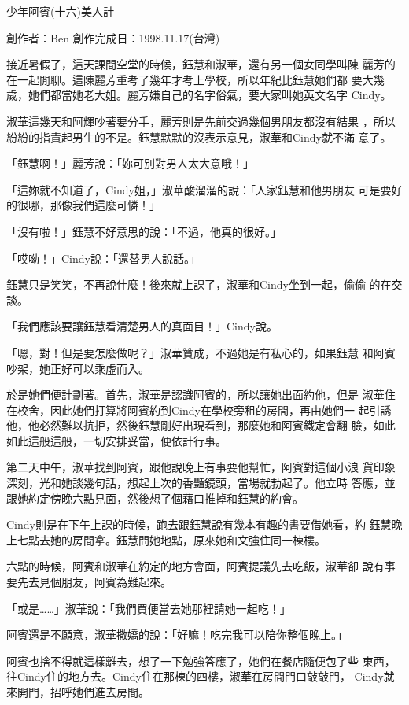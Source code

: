 



少年阿賓(十六)美人計

創作者：Ben
創作完成日：1998.11.17(台灣)


接近暑假了，這天課間空堂的時候，鈺慧和淑華，還有另一個女同學叫陳
麗芳的在一起閒聊。這陳麗芳重考了幾年才考上學校，所以年紀比鈺慧她們都
要大幾歲，她們都當她老大姐。麗芳嫌自己的名字俗氣，要大家叫她英文名字
Cindy。

淑華這幾天和阿輝吵著要分手，麗芳則是先前交過幾個男朋友都沒有結果
，所以紛紛的指責起男生的不是。鈺慧默默的沒表示意見，淑華和Cindy就不滿
意了。

「鈺慧啊！」麗芳說：「妳可別對男人太大意哦！」

「這妳就不知道了，Cindy姐，」淑華酸溜溜的說：「人家鈺慧和他男朋友
可是要好的很哪，那像我們這麼可憐！」

「沒有啦！」鈺慧不好意思的說：「不過，他真的很好。」

「哎呦！」Cindy說：「還替男人說話。」

鈺慧只是笑笑，不再說什麼！後來就上課了，淑華和Cindy坐到一起，偷偷
的在交談。

「我們應該要讓鈺慧看清楚男人的真面目！」Cindy說。

「嗯，對！但是要怎麼做呢？」淑華贊成，不過她是有私心的，如果鈺慧
和阿賓吵架，她正好可以乘虛而入。

於是她們便計劃著。首先，淑華是認識阿賓的，所以讓她出面約他，但是
淑華住在校舍，因此她們打算將阿賓約到Cindy在學校旁租的房間，再由她們一
起引誘他，他必然難以抗拒，然後鈺慧剛好出現看到，那麼她和阿賓鐵定會翻
臉，如此如此這般這般，一切安排妥當，便依計行事。

第二天中午，淑華找到阿賓，跟他說晚上有事要他幫忙，阿賓對這個小浪
貨印象深刻，光和她談幾句話，想起上次的香豔鏡頭，當場就勃起了。他立時
答應，並跟她約定傍晚六點見面，然後想了個藉口推掉和鈺慧的約會。

Cindy則是在下午上課的時候，跑去跟鈺慧說有幾本有趣的書要借她看，約
鈺慧晚上七點去她的房間拿。鈺慧問她地點，原來她和文強住同一棟樓。

六點的時候，阿賓和淑華在約定的地方會面，阿賓提議先去吃飯，淑華卻
說有事要先去見個朋友，阿賓為難起來。

「或是……」淑華說：「我們買便當去她那裡請她一起吃！」

阿賓還是不願意，淑華撒嬌的說：「好嘛！吃完我可以陪你整個晚上。」

阿賓也捨不得就這樣離去，想了一下勉強答應了，她們在餐店隨便包了些
東西，往Cindy住的地方去。Cindy住在那棟的四樓，淑華在房間門口敲敲門，
Cindy就來開門，招呼她們進去房間。

